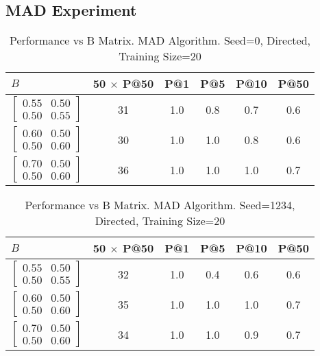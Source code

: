 \documentclass{tufte-handout}
\begin{document}
\subsection{MAD Experiment}
\label{sec:mad-experiment}
\begin{table}[htbp]
  \begin{tabular}{l c c c c c}
    $B$ & 50 $\times$ P@50 & P@1 & P@5 & P@10 & P@50 \\ \toprule
  $\begin{bmatrix} 0.55 & 0.50 \\0.50 &0.55 \end{bmatrix}$ & 31 & 1.0 & 0.8 & 0.7 & 0.6 \\
  $\begin{bmatrix} 0.60 & 0.50 \\0.50 &0.60 \end{bmatrix}$ & 30 & 1.0 & 1.0 & 0.8 & 0.6 \\
  $\begin{bmatrix} 0.70 & 0.50 \\0.50 &0.60 \end{bmatrix}$ & 36 & 1.0 & 1.0 & 1.0 & 0.7 \\
  \end{tabular}
  \caption{Performance vs B Matrix. MAD Algorithm. Seed=0, Directed, Training Size=20}
  \label{tab:perf-vs-b}
\end{table}

\begin{table}[htbp]
  \begin{tabular}{l c c c c c}
    $B$ & 50 $\times$ P@50 & P@1 & P@5 & P@10 & P@50 \\ \toprule
  $\begin{bmatrix} 0.55 & 0.50 \\0.50 &0.55 \end{bmatrix}$ & 32 & 1.0 & 0.4 & 0.6 & 0.6 \\
  $\begin{bmatrix} 0.60 & 0.50 \\0.50 &0.60 \end{bmatrix}$ & 35 & 1.0 & 1.0 & 1.0 & 0.7 \\
  $\begin{bmatrix} 0.70 & 0.50 \\0.50 &0.60 \end{bmatrix}$ & 34 & 1.0 & 1.0 & 0.9 & 0.7 \\
  \end{tabular}
  \caption{Performance vs B Matrix. MAD Algorithm. Seed=1234, Directed, Training Size=20}
  \label{tab:perf-vs-b}
\end{table}
\end{document}
